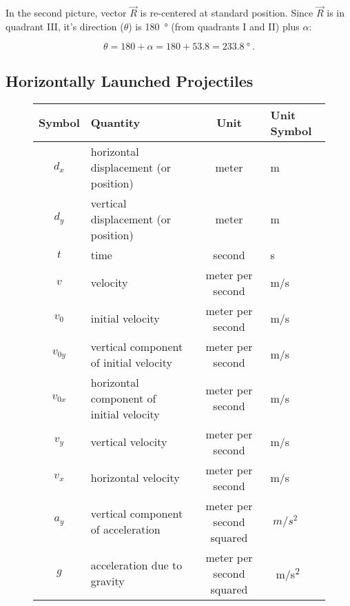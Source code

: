 \documentclass[main-physics.tex]{subfiles}
\begin{document}
In the second picture, vector $\vec{R}$ is re-centered at standard position. Since $\vec{R}$ is in quadrant III, it's direction ($\theta$) is \SI{180}{\degree} (from quadrants I and II) plus $\alpha$:

\begin{equation*}
    \theta = 180 + \alpha = 180 + 53.8 = \SI{233.8}{\degree}\ .
\end{equation*}


\subsection{Horizontally Launched Projectiles}

\begin{figure}[h!]
    \centering
    \begin{tabular}{cl|cl}
    \hline
    \textbf{Symbol} & \textbf{Quantity} & \textbf{Unit} & \textbf{Unit Symbol}  \\
    \hline\hline
        $d_x$ & horizontal displacement (or position) & meter & m\\
        $d_y$ & vertical displacement (or position) & meter & m\\
        $t$ & time & second & s\\
        $v$ & velocity & meter per second & m/s\\
        $v_0$ & initial velocity & meter per second & m/s\\
        $v_{0y}$ & vertical component of initial velocity & meter per second & m/s\\
        $v_{0x}$ & horizontal component of initial velocity & meter per second & m/s\\
        $v_y$ & vertical velocity & meter per second & m/s\\
        $v_x$ & horizontal velocity & meter per second & m/s\\
        $a_y$ & vertical component of acceleration & meter per second squared & $\SI{}{m/s^2}$\\
        $g$ & acceleration due to gravity & meter per second squared & \SI{}{m/s^2}\\
    \hline
    \end{tabular}
    \label{fig:my_label}
\end{figure}
\end{document}
